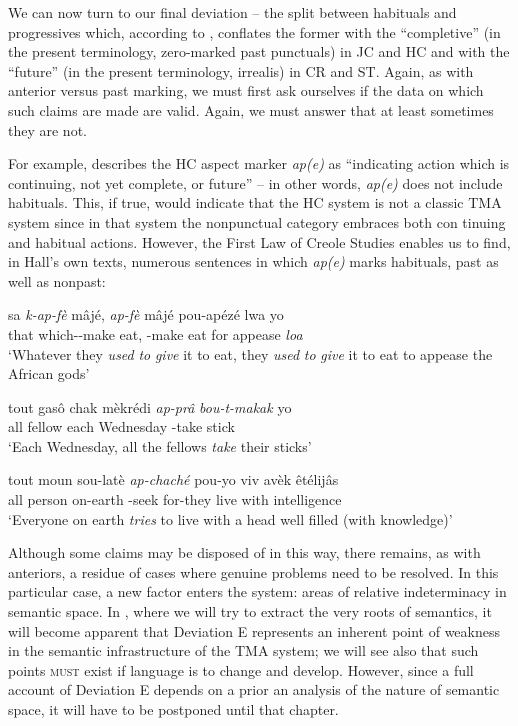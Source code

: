 We can now turn to our final deviation -- the split between habi\-tuals and progressives which, according to \citet{Taylor1971}, conflates the former with the ``completive'' (in the present terminology, zero-marked past punctuals) in JC and HC and with the ``future'' (in the present terminology, irrealis) in CR and ST. Again, as with anterior versus past marking, we must first ask ourselves if the data on which such claims are made are valid. Again, we must answer that at least sometimes they are not.

For example, \citet[31]{Hall1953} describes the HC aspect marker \textit{ap(e)} as ``indicating action which is continuing, not yet complete, or future'' -- in other words, \textit{ap(e)} does not include habituals. This, if true, would indicate that the HC system is not a classic TMA system since in that system the nonpunctual category embraces both con%
tinuing and habitual actions. However, the First Law of Creole Studies enables us to find, in Hall's own texts, numerous sentences in which \textit{ap(e)} marks habituals, past as well as nonpast:

\ea\label{ex:2:122}
\gll sa \emph{k-ap-fè} mâjé, \emph{ap-fè} mâjé pou-apézé lwa yo\\
that which-\ASP-make eat, \ASP-make eat {for appease} \textit{loa} {\PL}\\
\glt `Whatever they \textit{used} \textit{to} \textit{give} it to eat, they \textit{used} \textit{to} \textit{give} it to eat to appease the African gods'
\z

\ea\label{ex:2:123}
 \gll tout gasô chak mèkrédi \emph{ap-prâ} \emph{bou-t-makak} yo\\
all fellow each Wednesday \ASP-take stick {\PL}\\
\glt `Each Wednesday, all the fellows \textit{take} their sticks'
\z

\ea\label{ex:2:124}
\gll tout moun sou-latè \emph{ap-chaché} pou-yo viv avèk êtélijâs\\
all person on-earth \ASP-seek for-they live with intelligence\\
\glt `Everyone on earth \textit{tries} to live with a head well filled (with knowledge)'
\z

Although some claims may be disposed of in this way, there remains, as with anteriors, a residue of cases where genuine problems need to be resolved. In this particular case, a new factor enters the system: areas of relative indeterminacy in semantic space. In , where we will try to extract the very roots of semantics, it will become apparent that Deviation E represents an inherent point of weakness in the semantic infrastructure of the TMA system; we will see also that such points \textsc{must} exist if language is to change and develop. However, since a full account of Deviation E depends on a prior an analysis of the nature of semantic space, it will have to be postponed until that chapter.


